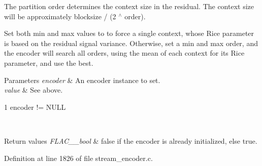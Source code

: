 The partition order determines the context size in the residual. The context size will be approximately {\ttfamily blocksize / (2 $^\wedge$ order)}.

Set both min and max values to {} to force a single context, whose Rice parameter is based on the residual signal variance. Otherwise, set a min and max order, and the encoder will search all orders, using the mean of each context for its Rice parameter, and use the best.

{} 
\begin{DoxyParams}{Parameters}
{\em encoder} & An encoder instance to set. \\
\hline
{\em value} & See above.  
\begin{DoxyCode}
1 encoder != NULL 
\end{DoxyCode}
 \\
\hline
\end{DoxyParams}

\begin{DoxyRetVals}{Return values}
{\em F\+L\+A\+C\+\_\+\+\_\+bool} & {\ttfamily false} if the encoder is already initialized, else {\ttfamily true}. \\
\hline
\end{DoxyRetVals}


Definition at line 1826 of file stream\+\_\+encoder.\+c.

